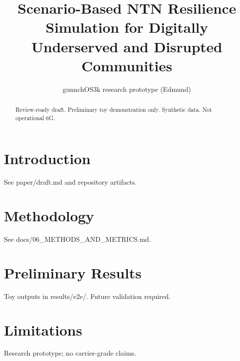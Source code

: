\documentclass{article}
\title{Scenario-Based NTN Resilience Simulation for Digitally Underserved and Disrupted Communities}
\author{gunnchOS3k research prototype (Edmund)}
\begin{document}
\maketitle
\begin{abstract}
Review-ready draft. Preliminary toy demonstration only. Synthetic data. Not operational 6G.
\end{abstract}
\section{Introduction}
See paper/draft.md and repository artifacts.
\section{Methodology}
See docs/06\_METHODS\_AND\_METRICS.md.
\section{Preliminary Results}
Toy outputs in results/e2e/. Future validation required.
\section{Limitations}
Research prototype; no carrier-grade claims.


\end{document}
